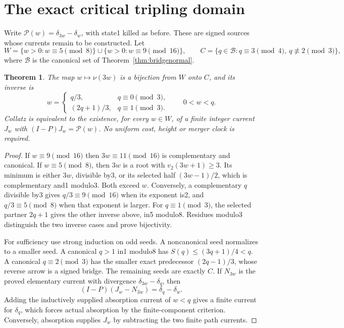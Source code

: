 \documentclass[11pt]{article}
\newtheorem{theorem}{Theorem}
\begin{document}
\section{The exact critical tripling domain}
Write $\mathcal P(w)=\delta_{3w}-\delta_w$, with state1 killed as before.
These are signed sources whose currents remain to be constructed. Let
\[
 W=\{w>0:w\equiv5\pmod8\}\cup\{w>0:w\equiv9\pmod{16}\},
 \qquad
 C=\{q\in\mathcal B:q\equiv3\pmod4,\ q\not\equiv2\pmod3\},
\]
where $\mathcal B$ is the canonical set of
Theorem~\ref{thm:bridgenormal}.
\begin{theorem}\label{thm:criticaltripling}
The map $w\mapsto\nu(3w)$ is a bijection from $W$ onto $C$,
and its inverse is
\[
 w=\begin{cases}q/3,&q\equiv0\pmod3,\\
 (2q+1)/3,&q\equiv1\pmod3.\end{cases}
 \qquad 0<w<q.
\]
Collatz is equivalent to the existence, for every $w\in W$, of a
finite integer current $J_w$ with $(I-P)J_w=\mathcal P(w)$.
No uniform cost, height or merger clock is required.
\end{theorem}
\begin{proof}
If $w\equiv9\pmod{16}$ then $3w\equiv11\pmod{16}$ is
complementary and canonical. If $w\equiv5\pmod8$, then $3w$
is a root with $v_2(3w+1)\ge3$. Its minimum is either $3w$,
divisible by3, or its selected half $(3w-1)/2$, which is
complementary and1 modulo3. Both exceed $w$. Conversely, a
complementary $q$ divisible by3 gives $q/3\equiv9\pmod{16}$
when its exponent is2, and $q/3\equiv5\pmod8$ when that exponent
is larger. For $q\equiv1\pmod3$, the selected partner $2q+1$
gives the other inverse above, in5 modulo8. Residues modulo3
distinguish the two inverse cases and prove bijectivity.

For sufficiency use strong induction on odd seeds. A noncanonical seed
normalizes to a smaller seed. A canonical $q>1$ in1 modulo8 has
$S(q)\le(3q+1)/4<q$. A canonical $q\equiv2\pmod3$ has the
smaller exact predecessor $(2q-1)/3$, whose reverse arrow is a
signed bridge. The remaining seeds are exactly $C$. If $N_{3w}$
is the proved elementary current with divergence
$\delta_{3w}-\delta_q$, then
\[
 (I-P)(J_w-N_{3w})=\delta_q-\delta_w.
\]
Adding the inductively supplied absorption current of $w<q$ gives
a finite current for $\delta_q$, which forces actual absorption by
the finite-component criterion. Conversely, absorption supplies
$J_w$ by subtracting the two finite path currents.
\end{proof}
\end{document}
